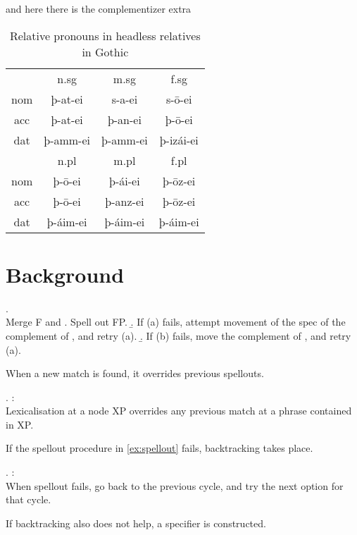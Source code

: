 and here there is the complementizer extra

\begin{table}[H]
 \center
 \caption {Relative pronouns in headless relatives in Gothic}
  \begin{tabular}{cccc}
  \toprule
       & \ac{n}.\ac{sg}  & \ac{m}.\ac{sg} & \ac{f}.\ac{sg}  \\
         \cmidrule{2-4}
    \ac{nom}  & þ-at-ei      & s-a-ei      & s-ō-ei     \\
    \ac{acc} & þ-at-ei       & þ-an-ei      & þ-ō-ei      \\
    \ac{dat}  & þ-amm-ei     & þ-amm-ei    & þ-izái-ei    \\
  \bottomrule
         & \ac{n}.\ac{pl} & \ac{m}.\ac{pl} & \ac{f}.\ac{pl} \\
          \cmidrule{2-4}
    \ac{nom}  & þ-ō-ei     & þ-ái-ei     & þ-ōz-ei     \\
    \ac{acc}  & þ-ō-ei      & þ-anz-ei    & þ-ōz-ei     \\
    \ac{dat}  & þ-áim-ei    & þ-áim-ei     & þ-áim-ei     \\
    \bottomrule
  \end{tabular}
\end{table}




\section{Background}

\ex. \\
Merge F and \label{ex:spellout}
 \a. Spell out FP.
 \b. If (a) fails, attempt movement of the spec of the complement of , and retry (a).
 \b. If (b) fails, move the complement of , and retry (a).

When a new match is found, it overrides previous spellouts.

\ex.  \citep{starke2018}:\\
Lexicalisation at a node XP overrides any previous match at a phrase contained in XP.

If the spellout procedure in \ref{ex:spellout} fails, backtracking takes place.

\ex.  \citep{starke2018}:\\
When spellout fails, go back to the previous cycle, and try the next option for that cycle.\label{ex:backtracking}

If backtracking also does not help, a specifier is constructed.


